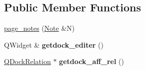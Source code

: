 \subsection*{Public Member Functions}
\begin{DoxyCompactItemize}
\item 
\hyperlink{classpage__notes_ad9a1b3dbe6c7901ed37a5784b1094fa6}{page\+\_\+notes} (\hyperlink{class_note}{Note} \&N)
\item 
\mbox{\label{classpage__notes_ab2beff1e0ece138a3a7e1419bfa8fbde}} 
Q\+Widget \& {\bfseries getdock\+\_\+editer} ()
\item 
\mbox{\label{classpage__notes_a6516f7d84e5a7f9cb06d733aa4a02697}} 
\hyperlink{class_q_dock_relation}{Q\+Dock\+Relation} $\ast$ {\bfseries getdock\+\_\+aff\+\_\+rel} ()
\end{DoxyCompactItemize}
